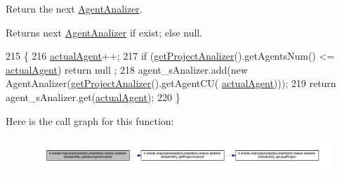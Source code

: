 Return the next \hyperlink{classit_1_1isislab_1_1masonassisteddocumentation_1_1mason_1_1analizer_1_1_agent_analizer}{Agent\-Analizer}. \begin{DoxyReturn}{Returns}
next \hyperlink{classit_1_1isislab_1_1masonassisteddocumentation_1_1mason_1_1analizer_1_1_agent_analizer}{Agent\-Analizer} if exist; else null. 
\end{DoxyReturn}

\begin{DoxyCode}
215                                                       \{
216         \hyperlink{classit_1_1isislab_1_1masonassisteddocumentation_1_1mason_1_1analizer_1_1_global_utility_ad969120645ce5135ca95177f6bb5ce42}{actualAgent}++;
217         \textcolor{keywordflow}{if} (\hyperlink{classit_1_1isislab_1_1masonassisteddocumentation_1_1mason_1_1analizer_1_1_global_utility_a78cbdc6022c558d1375a01095ad95659}{getProjectAnalizer}().getAgentsNum() <= \hyperlink{classit_1_1isislab_1_1masonassisteddocumentation_1_1mason_1_1analizer_1_1_global_utility_ad969120645ce5135ca95177f6bb5ce42}{actualAgent})    \textcolor{keywordflow}{return} null
      ;
218         agent\_sAnalizer.add(\textcolor{keyword}{new} AgentAnalizer(\hyperlink{classit_1_1isislab_1_1masonassisteddocumentation_1_1mason_1_1analizer_1_1_global_utility_a78cbdc6022c558d1375a01095ad95659}{getProjectAnalizer}().getAgentCU(
      \hyperlink{classit_1_1isislab_1_1masonassisteddocumentation_1_1mason_1_1analizer_1_1_global_utility_ad969120645ce5135ca95177f6bb5ce42}{actualAgent})));
219         \textcolor{keywordflow}{return} agent\_sAnalizer.get(\hyperlink{classit_1_1isislab_1_1masonassisteddocumentation_1_1mason_1_1analizer_1_1_global_utility_ad969120645ce5135ca95177f6bb5ce42}{actualAgent});     
220     \}
\end{DoxyCode}


Here is the call graph for this function\-:\nopagebreak
\begin{figure}[H]
\begin{center}
\leavevmode
\includegraphics[width=350pt]{classit_1_1isislab_1_1masonassisteddocumentation_1_1mason_1_1analizer_1_1_global_utility_a896b97176587fd1761f482d49a6c7fd4_cgraph}
\end{center}
\end{figure}




